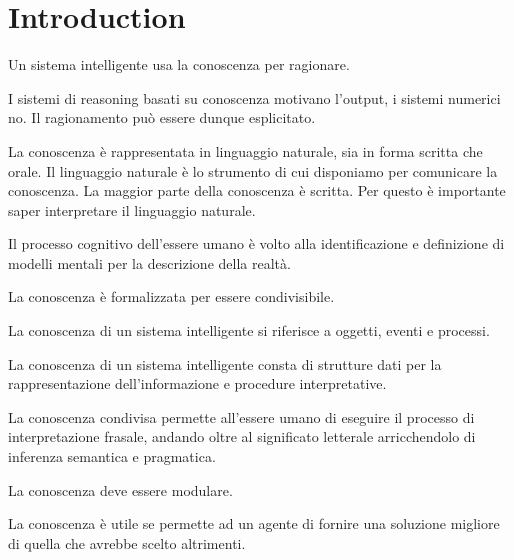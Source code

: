 \chapter{Introduction}
\label{chp:introduction}

Un sistema intelligente usa la conoscenza per ragionare.

I sistemi di reasoning basati su conoscenza motivano l'output, i sistemi numerici no.
Il ragionamento può essere dunque esplicitato.

La conoscenza è rappresentata in linguaggio naturale, sia in forma scritta che orale.  Il linguaggio naturale è lo strumento di cui disponiamo per comunicare la conoscenza. La maggior parte della conoscenza è scritta. Per questo è importante saper interpretare il linguaggio naturale.

Il processo cognitivo dell'essere umano è volto alla identificazione e definizione di modelli mentali per la descrizione della realtà.

La conoscenza è formalizzata per essere condivisibile.

La conoscenza di un sistema intelligente si riferisce a oggetti, eventi e processi.

La conoscenza di un sistema intelligente consta di strutture dati per la rappresentazione dell'informazione e procedure interpretative. 

La conoscenza condivisa permette all'essere umano di eseguire il processo di interpretazione frasale, andando oltre al significato letterale arricchendolo di inferenza semantica e pragmatica.

La conoscenza deve essere modulare.

La conoscenza è utile se permette ad un agente di fornire una soluzione migliore di quella che avrebbe scelto altrimenti.